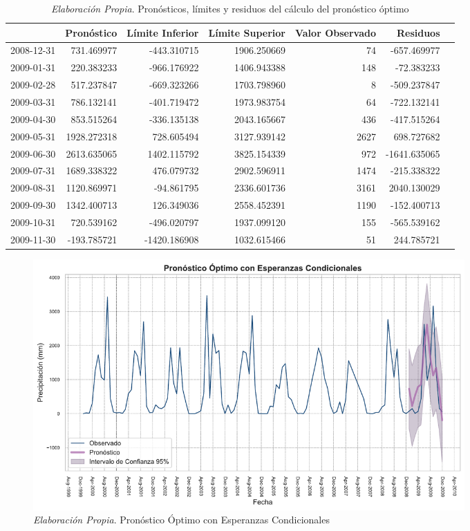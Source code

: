 \documentclass[12pt,letterpaper]{article}   %
\begin{document}
\begin{table}[ht]
\footnotesize
\centering
\begin{tabular}{lrrrrrr}
\toprule
 & \textbf{Pronóstico} & \textbf{Límite Inferior} & \textbf{Límite Superior} & \textbf{Valor Observado} & \textbf{Residuos} \\
\midrule
2008-12-31 & 731.469977 & -443.310715 & 1906.250669 & 74 & -657.469977 \\
2009-01-31 & 220.383233 & -966.176922 & 1406.943388 & 148 & -72.383233 \\
2009-02-28 & 517.237847 & -669.323266 & 1703.798960 & 8 & -509.237847 \\
2009-03-31 & 786.132141 & -401.719472 & 1973.983754 & 64 & -722.132141 \\
2009-04-30 & 853.515264 & -336.135138 & 2043.165667 & 436 & -417.515264 \\
2009-05-31 & 1928.272318 & 728.605494 & 3127.939142 & 2627 & 698.727682 \\
2009-06-30 & 2613.635065 & 1402.115792 & 3825.154339 & 972 & -1641.635065 \\
2009-07-31 & 1689.338322 & 476.079732 & 2902.596911 & 1474 & -215.338322 \\
2009-08-31 & 1120.869971 & -94.861795 & 2336.601736 & 3161 & 2040.130029 \\
2009-09-30 & 1342.400713 & 126.349036 & 2558.452391 & 1190 & -152.400713 \\
2009-10-31 & 720.539162 & -496.020797 & 1937.099120 & 155 & -565.539162 \\
2009-11-30 & -193.785721 & -1420.186908 & 1032.615466 & 51 & 244.785721 \\
\bottomrule
\end{tabular}
\caption{\textit{Elaboración Propia}. Pronósticos, límites y residuos del cálculo del pronóstico óptimo}
\end{table}


\begin{figure}[ht]
    \centering
    \includegraphics[width=0.8\textwidth]{imagenes/05-03-pronostico-optimo.pdf}
    \caption{\textit{Elaboración Propia}. Pronóstico Óptimo con Esperanzas Condicionales}
\end{figure}
\end{document}
